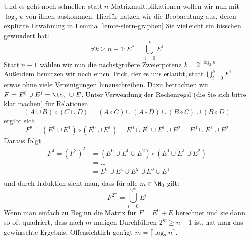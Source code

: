 Und es geht noch schneller: statt $n$ Matrixmultiplikationen wollen
wir nun mit $\log_2 n$ von ihnen auskommen. Hierfür nutzen wir die
Beobachtung aus, deren explizite Erwähnung in
Lemma~\ref{lem:e-stern-graphen} Sie vielleicht ein bisschen gewundert
hat:
\[
\forall k\geq n-1: E^* = \bigcup_{i=0}^{k} E^i
\]
Statt $n-1$ wählen wir nun die nächstgrößere Zweierpotenz $k=2^{\lceil
  \log_2 n \rceil}$. Außerdem benutzen wir noch einen Trick, der es
uns erlaubt, statt $\bigcup_{i=0}^{k} E^i$ etwas ohne viele
Vereinigungen hinzuschreiben. Dazu betrachten wir $F=E^0\cup
E^1=\Id_V\cup E$. Unter Verwendung der Rechenregel (die Sie sich bitte
klar machen) für Relationen
\[
(A\cup B)\circ(C\cup D) = (A\circ C) \cup (A\circ D) \cup (B\circ C) \cup (B \circ D)
\]
ergibt sich
\[
F^2 = (E^0\cup E^1)\circ(E^0\cup E^1)= E^0 \cup E^1\cup E^1 \cup E^2= E^0 \cup E^1 \cup E^2
\]
Daraus folgt
\begin{align*}
  F^4 = (F^2)^2 &= (E^0\cup E^1\cup E^2)\circ(E^0\cup E^1\cup E^2) \\
  &= \dots \\
  & = E^0 \cup E^1 \cup E^2\cup E^3 \cup E^4  \\
\end{align*}
und durch Induktion sieht man, dass für alle $m\in\N_0$ gilt:
\[
F^{2^m} = \bigcup_{i=0}^{2^m} E^i
\]
Wenn man einfach zu Beginn die Matrix für $F=E^0+E$ berechnet und sie
dann so oft quadriert, dass nach $m$-maligen Durchführen $2^m\geq
n-1$ ist, hat man das gewünschte Ergebnis. Offensichtlich genügt
$m=\lceil \log_2 n \rceil$.

